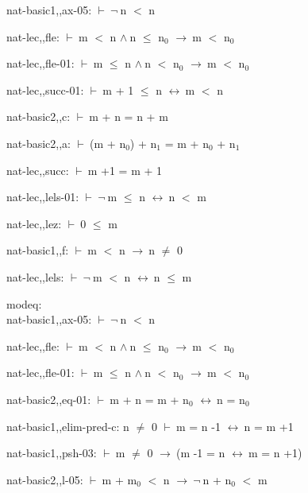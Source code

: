 \documentclass[a4paper]{article}
\newcommand{\Fol}{\mbox{$\vdash\ $}}
\newcommand{\Not}{\mbox{$\neg\ $}}
\newcommand{\And}{\mbox{$\wedge\ $}}
\newcommand{\Imp}{\mbox{$\rightarrow\ $}}
\newcommand{\Equiv}{\mbox{$\leftrightarrow\ $}}
\begin{document}
nat-basic1,,ax-05: 
 \Fol \Not n $<$ n



nat-lec,,fle: 
 \Fol m $<$ n \And n $\le$ $\mbox{n}_{0}$ \Imp m $<$ $\mbox{n}_{0}$



nat-lec,,fle-01: 
 \Fol m $\le$ n \And n $<$ $\mbox{n}_{0}$ \Imp m $<$ $\mbox{n}_{0}$



nat-lec,,succ-01: 
 \Fol m + 1 $\le$ n \Equiv m $<$ n



nat-basic2,,c: 
 \Fol m + n = n + m



nat-basic2,,a: 
 \Fol (m + $\mbox{n}_{0}$) + $\mbox{n}_{1}$ = m + $\mbox{n}_{0}$ + $\mbox{n}_{1}$



nat-lec,,succ: 
 \Fol m +1 = m + 1



nat-lec,,lels-01: 
 \Fol \Not m $\le$ n \Equiv n $<$ m



nat-lec,,lez: 
 \Fol 0 $\le$ m



nat-basic1,,f: 
 \Fol m $<$ n \Imp n $\neq$ 0



nat-lec,,lels: 
 \Fol \Not m $<$ n \Equiv n $\le$ m



\bigskip

modeq:\\ nat-basic1,,ax-05: 
 \Fol \Not n $<$ n



nat-lec,,fle: 
 \Fol m $<$ n \And n $\le$ $\mbox{n}_{0}$ \Imp m $<$ $\mbox{n}_{0}$



nat-lec,,fle-01: 
 \Fol m $\le$ n \And n $<$ $\mbox{n}_{0}$ \Imp m $<$ $\mbox{n}_{0}$



nat-basic2,,eq-01: 
 \Fol m + n = m + $\mbox{n}_{0}$ \Equiv n = $\mbox{n}_{0}$



nat-basic1,,elim-pred-c: 
n $\neq$ 0
 \Fol m = n -1 \Equiv n = m +1



nat-basic1,,psh-03: 
 \Fol m $\neq$ 0 \Imp (m -1 = n \Equiv m = n +1)



nat-basic2,,l-05: 
 \Fol m + $\mbox{m}_{0}$ $<$ n \Imp \Not n + $\mbox{n}_{0}$ $<$ m
\end{document}
